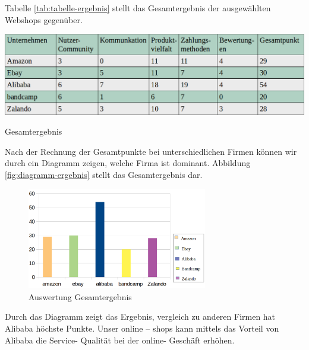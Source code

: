 Tabelle \vref{tab:tabelle-ergebnis} stellt das Gesamtergebnis der ausgewählten Webshops gegenüber.

\begin{table}[htbp]
	\centering
	\includegraphics[width=1\textwidth]{bilder/tabelle-ergebnis.png}
	\caption{Gesamtergebnis}
	\label{tab:tabelle-ergebnis}
\end{table}

Nach der Rechnung der Gesamtpunkte bei unterschiedlichen Firmen können wir durch ein Diagramm zeigen, welche Firma ist dominant. Abbildung \vref{fig:diagramm-ergebnis} stellt das Gesamtergebnis dar.

\begin{figure}[htbp]
	\centering
	\includegraphics[width=0.7\textwidth]{bilder/diagramm-ergebnis.png}
	\caption{Auswertung Gesamtergebnis}
	\label{fig:diagramm-ergebnis}
\end{figure}

Durch das Diagramm zeigt das Ergebnis, vergleich zu anderen Firmen hat Alibaba höchste Punkte. Unser online – shops kann mittels das Vorteil von Alibaba die Service- Qualität bei der  online- Geschäft erhöhen.